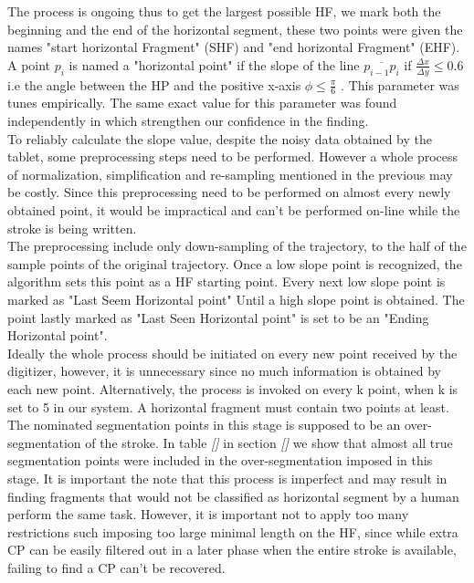 \documentclass[journal,compsoc]{IEEEtran}
\begin{document}
The process is ongoing thus to get the largest possible HF, we mark both the beginning and the end of the horizontal segment, these two points were given the names "start horizontal Fragment" (SHF) and "end horizontal Fragment" (EHF). 
A point $p_{i}$ is named a "horizontal point" if the slope of the line $\overline{p_{i-1}p_{i}}$ if $\frac{\Delta x}{\Delta y}\leq0.6$ i.e the angle between the HP and the positive x-axis $\phi \leq \frac{\pi}{6}$ . This parameter was tunes empirically. The same exact value for this parameter was found independently in \cite{daifallah2009recognition} which strengthen our confidence in the finding.\\
To reliably calculate the slope value, despite the noisy data obtained by the tablet, some preprocessing steps need to be performed. However a whole process of normalization, simplification and re-sampling mentioned in the previous may be costly. Since this preprocessing need to be performed on almost every newly obtained point, it would be impractical and can't be performed on-line while the stroke is being written.\\

The preprocessing include only down-sampling of the trajectory, to the half of the sample points of the original trajectory.
Once a low slope point is recognized, the algorithm sets this point as a HF starting point. Every next low slope point is marked as "Last Seem Horizontal point" Until a high slope point is obtained. The point lastly marked as "Last Seen Horizontal point" is set to be an "Ending Horizontal point".\\

Ideally the whole process should be initiated on every new point received by the digitizer, however, it is unnecessary since no much information is obtained by each new point. Alternatively, the process is invoked on every k point, when k is set to 5 in our system. A horizontal fragment must contain two points at least.\\

The nominated segmentation points in this stage is supposed to be an over-segmentation of the stroke. In table \emph{[]} in section \emph{[]} we show that almost all true segmentation points were included in the over-segmentation imposed in this stage. 
It is important the note that this process is imperfect and may result in finding fragments that would not be classified as horizontal segment by a human perform the same task. However, it is important not to apply too many restrictions such imposing too large minimal length on the HF, since while extra CP can be easily filtered out in a later phase when the entire stroke is available, failing to find a CP can't be recovered.\\
\end{document}

